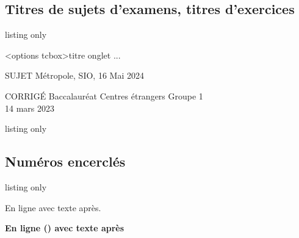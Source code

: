 \documentclass[french,11pt,a4paper]{article}
\begin{document}
\subsection{Titres de sujets d'examens, titres d'exercices}

\begin{DemoCode}{listing only}
\begin{TitreSujet}[Couleur=...,AlignH=...]<options tcbox>{titre onglet}
...
\end{TitreSujet}
\end{DemoCode}

\begin{DemoCode}{}
\begin{TitreSujet}[Couleur=red!50!black]{SUJET}
Métropole, SIO, 16 Mai 2024
\end{TitreSujet}
\end{DemoCode}

\begin{DemoCode}{}
\begin{TitreSujet}[Couleur=teal,AlignH=center]{CORRIGÉ}
Baccalauréat Centres étrangers Groupe 1\\
14 mars 2023
\end{TitreSujet}
\end{DemoCode}

\begin{DemoCode}{listing only}
\end{DemoCode}

\begin{DemoCode}{}

\end{DemoCode}

\subsection{Numéros encerclés}

\begin{DemoCode}{listing only}
\end{DemoCode}

\begin{DemoCode}{}
En ligne  avec texte après.
\end{DemoCode}

\begin{DemoCode}{}
{\bfseries\sffamily\Huge En ligne () avec texte après}
\end{DemoCode}
\end{document}
